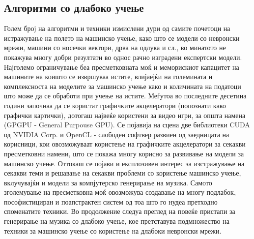 \subsection{Алгоритми со длабоко учење} 

Голем број на алгоритми и техники измислени дури од самите почетоци на истражување на полето на машинско учење, како што се модели со невронски мрежи, машини со носечки вектори, дрва на одлука и сл., во минатото не покажува многу добри резултати во однос рачно изградени експертски модели. Најголемо ограничување беа пресметковната моќ и меморискиот капацитет на машините на коишто се извршуваа истите, влијаејќи на големината и комплексноста на моделите за машинско учење како и количината на податоци што може да се обработи при учење на истите. Меѓутоа во последните десетина години започнаа да се користат графичките акцелератори (попознати како графички картички), дотогаш највеќе користени за видео игри, за општа намена (GPGPU - General Purpouse GPU). Се појавија на сцена две библиотеки CUDA од NVIDIA Corp. и OpenCL - слободен софтвер развиен од заедницата на корисници, кои овозможуваат користење на графичките акцелератори за секакви пресметковни намени, што се покажа многу корисно за развивање на модели за машинско учење. Оттокаш се појави и експлозивен интерес за изстражување на секакви теми и решавање на секакви проблеми со користење машинско учење, вклучувајќи и модели за компјутерско генерирање на музика. Самото зголемување на пресметковна моќ овозможува создавање на многу подлабок, пософистициран и поапстрактен систем од тоа што го нудеа претходно споменатите техники. Во продолжение следуа преглед на повеќе пристапи за генерирање на музика со длабоко учење, кое претставува подмножество на техники за машинско учење со користење на длабоки невронски мрежи.


